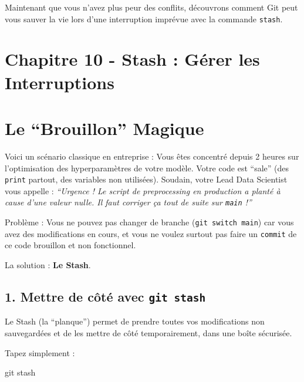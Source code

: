 \documentclass[
  letterpaper,
  DIV=11,
  numbers=noendperiod]{scrreprt}
\newenvironment{Shaded}{\begin{snugshade}}{\end{snugshade}}
\newcommand{\FunctionTok}[1]{\textcolor[rgb]{0.28,0.35,0.67}{#1}}
\newcommand{\NormalTok}[1]{\textcolor[rgb]{0.00,0.23,0.31}{#1}}
\begin{document}
Maintenant que vous n'avez plus peur des conflits, découvrons comment
Git peut vous sauver la vie lors d'une interruption imprévue avec la
commande \texttt{stash}.


\section{Chapitre 10 - Stash : Gérer les
Interruptions}\label{chapitre-10---stash-guxe9rer-les-interruptions}


\section{Le ``Brouillon'' Magique}\label{le-brouillon-magique}

Voici un scénario classique en entreprise : Vous êtes concentré depuis 2
heures sur l'optimisation des hyperparamètres de votre modèle. Votre
code est ``sale'' (des \texttt{print} partout, des variables non
utilisées). Soudain, votre Lead Data Scientist vous appelle :
\emph{``Urgence ! Le script de preprocessing en production a planté à
cause d'une valeur nulle. Il faut corriger ça tout de suite sur
\texttt{main} !''}

Problème : Vous ne pouvez pas changer de branche
(\texttt{git\ switch\ main}) car vous avez des modifications en cours,
et vous ne voulez surtout pas faire un \texttt{commit} de ce code
brouillon et non fonctionnel.

La solution : \textbf{Le Stash}.

\subsection{\texorpdfstring{1. Mettre de côté avec
\texttt{git\ stash}}{1. Mettre de côté avec git stash}}\label{mettre-de-cuxf4tuxe9-avec-git-stash}

Le Stash (la ``planque'') permet de prendre toutes vos modifications non
sauvegardées et de les mettre de côté temporairement, dans une boîte
sécurisée.

Tapez simplement :

\begin{Shaded}
\begin{Highlighting}[]
\FunctionTok{git}\NormalTok{ stash}
\end{Highlighting}
\end{Shaded}
\end{document}
